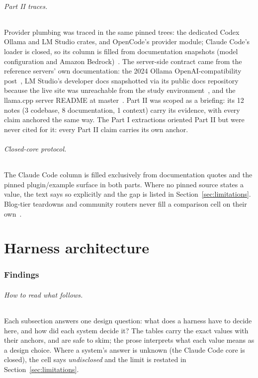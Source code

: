 \documentclass{article}
\newcommand{\codex}[0]{Codex}
\newcommand{\occ}[0]{OpenCode}
\newcommand{\ccc}[0]{Claude Code}
\begin{document}
\paragraph{Part II traces.} Provider plumbing was traced in the same pinned
trees: the dedicated \codex{} Ollama and LM Studio crates, and \occ{}'s
provider module; \ccc{}'s loader is closed, so its column is filled from
documentation snapshots (model configuration and Amazon
Bedrock)~\citep{claudeCodeModelDocs,claudeCodeBedrockDocs}. The
server-side contract came from the reference servers' own documentation:
the 2024 Ollama OpenAI-compatibility post~\citep{ollamaCompatDocs}, LM
Studio's developer docs snapshotted via its public docs repository because
the live site was unreachable from the study
environment~\citep{lmstudioApiDocs}, and the llama.cpp server README at
master~\citep{llamaCppServerDocs}. Part II was scoped as a briefing: its
12 notes (3 codebase, 8 documentation, 1 context) carry its evidence, with
every claim anchored the same way.
The Part I extractions oriented Part II but were never cited for it: every
Part II claim carries its own anchor.

\paragraph{Closed-core protocol.} The \ccc{} column is filled exclusively
from documentation quotes and the pinned plugin/example surface in both
parts. Where no pinned source states a value, the text says so explicitly
and the gap is listed in Section~\ref{sec:limitations}. Blog-tier teardowns
and community routers never fill a comparison cell on
their own~\citep{claudeCodePluginSurface,agiflowClaudeCodeInternals,claudeCodeRouterContext}.

\part{Harness architecture}

\section{Findings}
\label{sec:findings}

\paragraph{How to read what follows.} Each subsection answers one design
question: what does a harness have to decide here, and how did each
system decide it? The tables carry the exact values with their anchors,
and are safe to skim; the prose interprets what each value means as a
design choice. Where a system's answer is unknown (the \ccc{} core is
closed), the cell says \emph{undisclosed} and the limit is restated in
Section~\ref{sec:limitations}.
\end{document}
